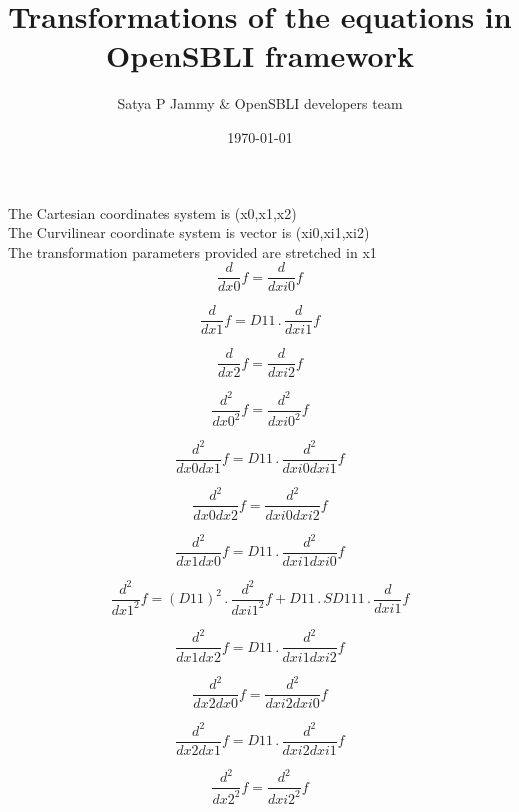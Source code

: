 \documentclass{article}
\title{Transformations of the equations in OpenSBLI framework}
\author{Satya P Jammy \& OpenSBLI developers team}
\date{\today}
\begin{document}
\maketitle
\noindent The Cartesian coordinates system is (x0,x1,x2)\\\noindent The Curvilinear coordinate system is vector is (xi0,xi1,xi2)\\\noindent The transformation parameters provided are stretched in x1\\\begin{dmath}\frac{d}{d x0} f = \frac{d}{d xi0} f\end{dmath}

\begin{dmath}\frac{d}{d x1} f = D11 \,.\, \frac{d}{d xi1} f\end{dmath}

\begin{dmath}\frac{d}{d x2} f = \frac{d}{d xi2} f\end{dmath}

\begin{dmath}\frac{d^{2}}{d x0^{2}}  f = \frac{d^{2}}{d xi0^{2}}  f\end{dmath}

\begin{dmath}\frac{d^{2}}{d x0d x1}  f = D11 \,.\, \frac{d^{2}}{d xi0d xi1}  f\end{dmath}

\begin{dmath}\frac{d^{2}}{d x0d x2}  f = \frac{d^{2}}{d xi0d xi2}  f\end{dmath}

\begin{dmath}\frac{d^{2}}{d x1d x0}  f = D11 \,.\, \frac{d^{2}}{d xi1d xi0}  f\end{dmath}

\begin{dmath}\frac{d^{2}}{d x1^{2}}  f = \left(D11 \right)^{2} \,.\, \frac{d^{2}}{d xi1^{2}}  f + D11 \,.\, SD111 \,.\, \frac{d}{d xi1} f\end{dmath}

\begin{dmath}\frac{d^{2}}{d x1d x2}  f = D11 \,.\, \frac{d^{2}}{d xi1d xi2}  f\end{dmath}

\begin{dmath}\frac{d^{2}}{d x2d x0}  f = \frac{d^{2}}{d xi2d xi0}  f\end{dmath}

\begin{dmath}\frac{d^{2}}{d x2d x1}  f = D11 \,.\, \frac{d^{2}}{d xi2d xi1}  f\end{dmath}

\begin{dmath}\frac{d^{2}}{d x2^{2}}  f = \frac{d^{2}}{d xi2^{2}}  f\end{dmath}
\end{document}
